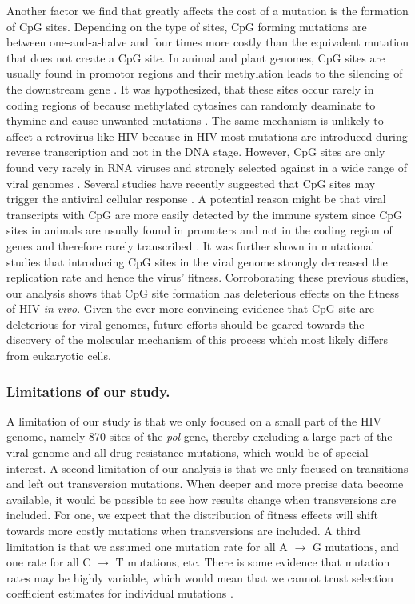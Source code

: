 \documentclass{article}
\begin{document}
Another factor we find that greatly affects the cost of a mutation is the formation of CpG sites. Depending on the type of sites, CpG forming mutations are between one-and-a-halve and four times more costly than the equivalent mutation that does not create a CpG site. 
In animal and plant genomes, CpG sites are usually found in  promotor regions and their methylation leads to the silencing of the downstream gene \cite{law2010establishing}. It was hypothesized, that these sites occur rarely in coding regions of because methylated cytosines can randomly deaminate to thymine and cause unwanted mutations \cite{scarano1967heterogeneity}. The same mechanism is unlikely to affect a retrovirus like HIV because in HIV most mutations are introduced during reverse transcription and not in the DNA stage.
However, CpG sites are only found very rarely in RNA viruses \cite{rima1997dinucleotide} and strongly selected against in a wide range of viral genomes \cite{cheng2013cpg}. 
Several studies have recently suggested that CpG sites may trigger the antiviral cellular response \cite{burns2009genetic, atkinson2014influence}. A potential reason might be that viral transcripts with CpG are more easily detected by the immune system since CpG sites in animals are usually found in promoters and not in the coding region of genes and therefore rarely transcribed \cite{van2012biased}. 
It was further shown in mutational studies that introducing CpG sites in the viral genome strongly decreased the replication rate \cite{burns2009genetic, atkinson2014influence} and hence the virus' fitness.
Corroborating these previous studies, our analysis shows that CpG site formation has deleterious effects on the fitness of HIV \textit {in vivo}.
Given the ever more convincing evidence that CpG site are deleterious for viral genomes, future efforts should be geared towards the discovery of the molecular mechanism of this process which most likely differs from eukaryotic cells.

\subsubsection*{Limitations of our study.}
A limitation of our study is that we only focused on a small part of the HIV genome, namely 870 sites of the \textit {pol} gene, thereby excluding a large part of the viral genome and all drug resistance mutations, which would be of special interest. 
A second limitation of our analysis is that we only focused on transitions and left out transversion mutations. When deeper and more precise data become available, it would be possible to see how results change when transversions are included. For one, we expect that the distribution of fitness effects will shift towards more costly mutations when transversions are included.  
A third limitation is that we assumed one mutation rate for all A $\rightarrow$ G mutations, and one rate for all C $\rightarrow$ T mutations, etc. There is some evidence that mutation rates may be highly variable, which would mean that we cannot trust selection coefficient estimates for individual mutations \cite{geller2016highly}. 
\end{document}
